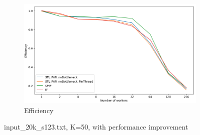 \documentclass[12pt,a4paper]{report}
\begin{document}
\begin{figure}
\begin{subfigure}[b]{0.45\textwidth}
         \centering
         \includegraphics[width=\textwidth]{images/optimized-20k/efficiency.png}
         \caption{Efficiency}
         \label{fig:improved performance}
     \end{subfigure}
        \caption{{input\_20k\_s123.txt, K=50, with performance improvement}}
        \label{fig:three graphs}
\end{figure}
\end{document}
